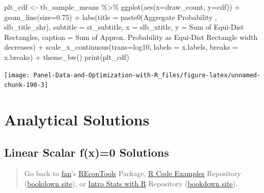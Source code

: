 \documentclass[
]{book}
\newenvironment{Shaded}{\begin{snugshade}}{\end{snugshade}}
\newcommand{\AttributeTok}[1]{\textcolor[rgb]{0.77,0.63,0.00}{#1}}
\newcommand{\FloatTok}[1]{\textcolor[rgb]{0.00,0.00,0.81}{#1}}
\newcommand{\FunctionTok}[1]{\textcolor[rgb]{0.00,0.00,0.00}{#1}}
\newcommand{\NormalTok}[1]{#1}
\newcommand{\OtherTok}[1]{\textcolor[rgb]{0.56,0.35,0.01}{#1}}
\newcommand{\SpecialCharTok}[1]{\textcolor[rgb]{0.00,0.00,0.00}{#1}}
\newcommand{\StringTok}[1]{\textcolor[rgb]{0.31,0.60,0.02}{#1}}
\begin{document}
\begin{Shaded}
\begin{Highlighting}[]
\NormalTok{plt\_cdf }\OtherTok{\textless{}{-}}\NormalTok{ tb\_sample\_means }\SpecialCharTok{\%\textgreater{}\%}
  \FunctionTok{ggplot}\NormalTok{(}\FunctionTok{aes}\NormalTok{(}\AttributeTok{x=}\NormalTok{draw\_count, }\AttributeTok{y=}\NormalTok{cdf)) }\SpecialCharTok{+}
  \FunctionTok{geom\_line}\NormalTok{(}\AttributeTok{size=}\FloatTok{0.75}\NormalTok{) }\SpecialCharTok{+}
  \FunctionTok{labs}\NormalTok{(}\AttributeTok{title =} \FunctionTok{paste0}\NormalTok{(}\StringTok{\textquotesingle{}Aggregate Probability \textquotesingle{}}\NormalTok{, slb\_title\_shr),}
       \AttributeTok{subtitle =}\NormalTok{ st\_subtitle,}
       \AttributeTok{x =}\NormalTok{ slb\_xtitle,}
       \AttributeTok{y =} \StringTok{\textquotesingle{}Sum of Equi{-}Dist Rectangles\textquotesingle{}}\NormalTok{,}
       \AttributeTok{caption =} \StringTok{\textquotesingle{}Sum of Approx. Probability as Equi{-}Dist Rectangle width decreases\textquotesingle{}}\NormalTok{) }\SpecialCharTok{+}
  \FunctionTok{scale\_x\_continuous}\NormalTok{(}\AttributeTok{trans=}\StringTok{\textquotesingle{}log10\textquotesingle{}}\NormalTok{, }\AttributeTok{labels =}\NormalTok{ x.labels, }\AttributeTok{breaks =}\NormalTok{ x.breaks) }\SpecialCharTok{+}
  \FunctionTok{theme\_bw}\NormalTok{()}
\FunctionTok{print}\NormalTok{(plt\_cdf)}
\end{Highlighting}
\end{Shaded}

\begin{center}\texttt{[image: Panel-Data-and-Optimization-with-R\_files/figure-latex/unnamed-chunk-190-3]} \end{center}

\hypertarget{analytical-solutions}{%
\section{Analytical Solutions}\label{analytical-solutions}}

\hypertarget{linear-scalar-fx0-solutions}{%
\subsection{Linear Scalar f(x)=0 Solutions}\label{linear-scalar-fx0-solutions}}

\begin{quote}
Go back to \href{http://fanwangecon.github.io/}{fan}'s \href{https://fanwangecon.github.io/REconTools/}{REconTools} Package, \href{https://fanwangecon.github.io/R4Econ/}{R Code Examples} Repository (\href{https://fanwangecon.github.io/R4Econ/bookdown}{bookdown site}), or \href{https://fanwangecon.github.io/Stat4Econ/}{Intro Stats with R} Repository (\href{https://fanwangecon.github.io/Stat4Econ/bookdown}{bookdown site}).
\end{quote}
\end{document}
